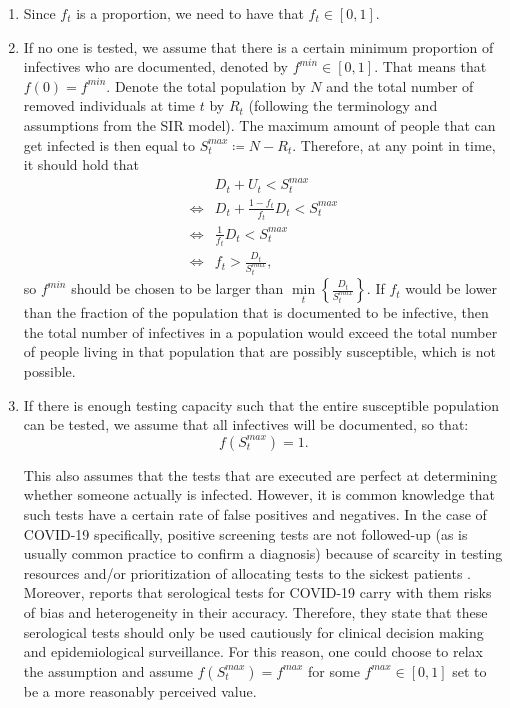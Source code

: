 \documentclass[12pt]{article}
\begin{document}
	\begin{enumerate}[label=(A\arabic*)]
		\item\label{ass:undoc_proportion} Since $f_t$ is a proportion, we need to have that $f_t \in [0,1]$.
		\item\label{ass:undoc_f0} If no one is tested, we assume that there is a certain minimum proportion of infectives who are documented, denoted by $f^{min} \in [0,1]$. That means that $f(0) = f^{min}$. Denote the total population by $N$ and the total number of removed individuals at time $t$ by $R_t$ (following the terminology and assumptions from the SIR model). The maximum amount of people that can get infected is then equal to $S^{max}_t \coloneqq N - R_t$. Therefore, at any point in time, it should hold that
    	    \begin{align*}
        	    & D_t + U_t < S^{max}_t \\
        	    \iff & D_t + \frac{1-f_t}{f_t}D_t < S^{max}_t \\
        	    \iff & \frac{1}{f_t}D_t < S^{max}_t \\
        	    \iff & f_t > \frac{D_t}{S^{max}_t},
    	    \end{align*}
		so $f^{min}$ should be chosen to be larger than $\min\limits_{t}\left\{\frac{D_t}{S^{max}_t}\right\}$. If $f_t$ would be lower than the fraction of the population that is documented to be infective, then the total number of infectives in a population would exceed the total number of people living in that population that are possibly susceptible, which is not possible.
		
		
		\item\label{ass:undoc_fN} If there is enough testing capacity such that the entire susceptible population can be tested, we assume that all infectives will be documented, so that:
		    \[f(S^{max}_t) = 1.\]
		    
		\noindent This also assumes that the tests that are executed are perfect at determining whether someone actually is infected. However, it is common knowledge that such tests have a certain rate of false positives and negatives. In the case of COVID-19 specifically, positive screening tests are not followed-up (as is usually common practice to confirm a diagnosis) because of scarcity in testing resources and/or prioritization of allocating tests to the sickest patients \parencite{frasier2020tests}. Moreover, \textcite{bmj2020testaccuracy} reports that serological tests for COVID-19 carry with them risks of bias and heterogeneity in their accuracy. Therefore, they state that these serological tests should only be used cautiously for clinical decision making and epidemiological surveillance. For this reason, one could choose to relax the assumption and assume $f(S^{max}_t) = f^{max}$ for some $f^{max} \in [0,1]$ set to be a more reasonably perceived value.
		

\end{enumerate}
\end{document}
